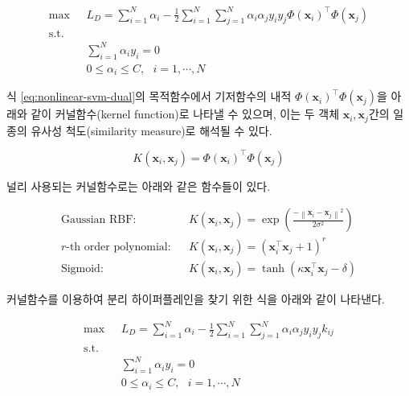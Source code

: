 \documentclass[]{book}
\begin{document}
\begin{equation}
\begin{split}
\max \text{  } & L_D = \sum_{i = 1}^{N} \alpha_i - \frac{1}{2} \sum_{i = 1}^{N} \sum_{j = 1}^{N} \alpha_i \alpha_j y_i y_j \Phi(\mathbf{x}_i)^\top \Phi(\mathbf{x}_j)\\
\text{s.t. } &\\
& \sum_{i = 1}^{N} \alpha_i y_i = 0\\
& 0 \le \alpha_i \le C, \text{  } i = 1, \cdots, N
\end{split}
\label{eq:nonlinear-svm-dual}
\end{equation}

식 \eqref{eq:nonlinear-svm-dual}의 목적함수에서 기저함수의 내적 \(\Phi(\mathbf{x}_i)^\top \Phi(\mathbf{x}_j)\)을 아래와 같이 커널함수(kernel function)로 나타낼 수 있으며, 이는 두 객체 \(\mathbf{x}_i, \mathbf{x}_j\)간의 일종의 유사성 척도(similarity measure)로 해석될 수 있다.

\begin{equation*}
K(\mathbf{x}_i, \mathbf{x}_j) = \Phi(\mathbf{x}_i)^\top \Phi(\mathbf{x}_j)
\end{equation*}

널리 사용되는 커널함수로는 아래와 같은 함수들이 있다.

\begin{eqnarray*}
\text{Gaussian RBF:} & & K(\mathbf{x}_i, \mathbf{x}_j) = \exp \left( \frac{- \left\lVert \mathbf{x}_i - \mathbf{x}_j \right\rVert^2}{2 \sigma^2} \right)\\
\text{$r$-th order polynomial:} & & K(\mathbf{x}_i, \mathbf{x}_j) = \left( \mathbf{x}_i^\top \mathbf{x}_j + 1 \right)^r \\
\text{Sigmoid:} & & K(\mathbf{x}_i, \mathbf{x}_j) = \tanh \left(\kappa \mathbf{x}_i^\top \mathbf{x}_j - \delta \right)
\end{eqnarray*}

커널함수를 이용하여 분리 하이퍼플레인을 찾기 위한 식을 아래와 같이 나타낸다.

\begin{equation}
\begin{split}
\max \text{  } & L_D = \sum_{i = 1}^{N} \alpha_i - \frac{1}{2} \sum_{i = 1}^{N} \sum_{j = 1}^{N} \alpha_i \alpha_j y_i y_j k_{ij}\\
\text{s.t. } &\\
& \sum_{i = 1}^{N} \alpha_i y_i = 0\\
& 0 \le \alpha_i \le C, \text{  } i = 1, \cdots, N
\end{split}
\label{eq:nonlinear-svm-dual-kernel}
\end{equation}
\end{document}
